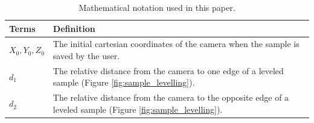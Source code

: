 \begin{table}[htbp]
    \centering
    \begin{tabular}{ |p{3.5cm}||p{11.5cm}|  }
      \hline
      \hline
      Terms & Definition\\ 
      \hline
      $X_0, Y_0, Z_0$   &The initial cartesian coordinates of the camera when the sample is saved by the user. \\
      $d_1$ & The relative distance from the camera to one edge of a leveled sample (Figure \ref{fig:sample_levelling}).\\
      $d_2$ & The relative distance from the camera to the opposite edge of a leveled sample (Figure \ref{fig:sample_levelling}). \\
      \hline
    \end{tabular}
    \caption{Mathematical notation used in this paper.} %
    \label{tab:math_notation}
  \end{table}
    
